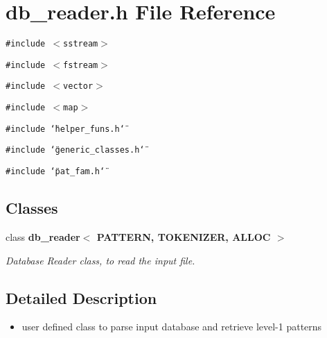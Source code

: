 \section{db\_\-reader.h File Reference}
\label{db__reader_8h}
{\tt \#include $<$sstream$>$}\par
{\tt \#include $<$fstream$>$}\par
{\tt \#include $<$vector$>$}\par
{\tt \#include $<$map$>$}\par
{\tt \#include \char`\"{}helper\_\-funs.h\char`\"{}}\par
{\tt \#include \char`\"{}generic\_\-classes.h\char`\"{}}\par
{\tt \#include \char`\"{}pat\_\-fam.h\char`\"{}}\par
\subsection*{Classes}
\begin{CompactItemize}
\item 
class \bf{db\_\-reader$<$ PATTERN, TOKENIZER, ALLOC $>$}
\begin{CompactList}\small\item\em Database Reader class, to read the input file. \item\end{CompactList}\end{CompactItemize}


\subsection{Detailed Description}
\begin{itemize}
\item user defined class to parse input database and retrieve level-1 patterns \end{itemize}

